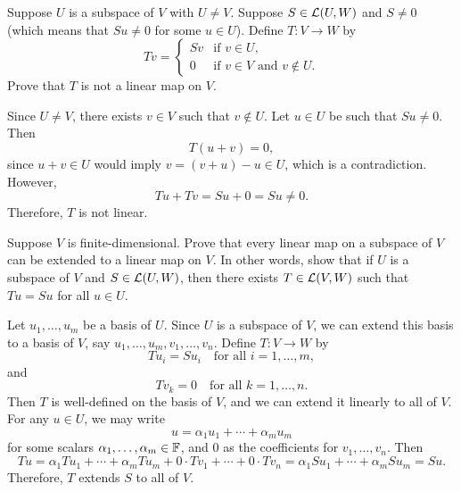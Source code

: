 \begin{exercise}
Suppose $U$ is a subspace of $V$ with $U\ne V$. Suppose $S\in\mathcal{L}(U,W)$ and
$S\ne0$ (which means that $Su\ne0$ for some $u\in U$). Define
$T\colon V\to W$ by
\[ Tv=\begin{cases} Sv & \text{if } v\in U,\\
   0 & \text{if } v\in V \text{ and } v\notin U. \end{cases} \]
Prove that $T$ is not a linear map on $V$.
\end{exercise}
\begin{solution}
Since $U\ne V$, there exists $v\in V$ such that $v\notin U$. Let $u\in U$ be
such that $Su\ne0$. Then
\[ T(u+v)=0, \]
since $u+v\in U$ would imply $v=(v+u)-u\in U$, which is a contradiction.
However,
\[ Tu+Tv=Su+0=Su\ne0. \]
Therefore, $T$ is not linear.
\end{solution}

\begin{exercise}
Suppose $V$ is finite-dimensional. Prove that every linear map on a subspace
of $V$ can be extended to a linear map on $V$. In other words, show that if
$U$ is a subspace of $V$ and $S\in\mathcal{L}(U,W)$, then there exists
$T\in\mathcal{L}(V,W)$ such that $Tu=Su$ for all $u\in U$.
\end{exercise}
\begin{solution}
Let $u_1,\dots,u_m$ be a basis of $U$. Since $U$ is a subspace of $V$, we can
extend this basis to a basis of $V$, say $u_1,\dots,u_m,v_1,\dots,v_n$. Define
$T\colon V\to W$ by
\[ Tu_i=Su_i \quad\text{for all } i=1,\dots,m, \]
and
\[ Tv_k=0 \quad\text{for all } k=1,\dots,n. \]
Then $T$ is well-defined on the basis of $V$, and we can extend it linearly to
all of $V$. For any $u\in U$, we may write
\[ u=\alpha_1u_1+\cdots+\alpha_mu_m \]
for some scalars $\alpha_1,\dots,\alpha_m\in\mathbb{F}$, and $0$ as the coefficients
for $v_1,\dots,v_n$. Then
\[ Tu=\alpha_1Tu_1+\cdots+\alpha_mTu_m+0\cdot Tv_1+\cdots+0\cdot Tv_n
   =\alpha_1Su_1+\cdots+\alpha_mSu_m=Su. \]
Therefore, $T$ extends $S$ to all of $V$.
\end{solution}

